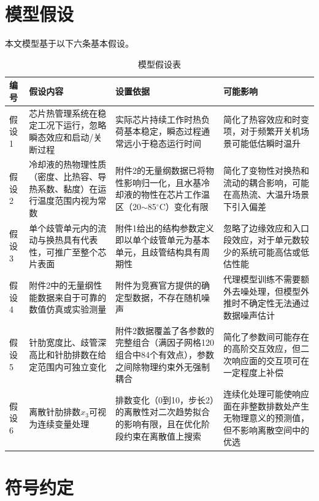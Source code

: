 \documentclass[12pt,a4paper]{ctexart}
\begin{document}
\section{模型假设}

本文模型基于以下六条基本假设。

\begin{table}[H]
\centering
\caption{模型假设表}
\footnotesize
\begin{tabular}{p{}p{}p{}p{}}
\toprule
编号 & 假设内容 & 设置依据 & 可能影响 \\
\midrule
假设1 & 芯片热管理系统在稳定工况下运行，忽略瞬态效应和启动/关断过程 & 实际芯片持续工作时热负荷基本稳定，瞬态过程通常远小于稳态运行时间 & 简化了热容效应和时变项，对于频繁开关机场景可能低估瞬时温升 \\
\addlinespace
假设2 & 冷却液的热物理性质（密度、比热容、导热系数、黏度）在运行温度范围内视为常数 & 附件2的无量纲数据已将物性影响归一化，且水基冷却液的物性在芯片工作温区（20$\sim$85$^\circ$C）变化有限 & 简化了变物性对换热和流动的耦合影响，可能在高热流、大温升场景下引入偏差 \\
\addlinespace
假设3 & 单个歧管单元内的流动与换热具有代表性，可推广至整个芯片表面 & 附件1给出的结构参数定义即以单个歧管单元为基本单元，且歧管结构具有周期性 & 忽略了边缘效应和入口段效应，对于单元数较少的系统可能高估或低估性能 \\
\addlinespace
假设4 & 附件2中的无量纲性能数据来自于可靠的数值仿真或实验测量 & 附件为竞赛官方提供的确定型数据，不存在随机噪声 & 代理模型训练不需要额外去噪处理，但模型外推时不确定性无法通过数据噪声估计 \\
\addlinespace
假设5 & 针肋宽度比、歧管深高比和针肋排数在给定范围内可独立变化 & 附件2数据覆盖了各参数的完整组合（满因子网格120组合中84个有效点），参数之间除物理约束外无强制耦合 & 简化了参数间可能存在的高阶交互效应，但二次响应面的交互项可在一定程度上补偿 \\
\addlinespace
假设6 & 离散针肋排数$x_3$可视为连续变量处理 & 排数变化（0到10，步长2）的离散性对二次趋势拟合的影响有限，且在优化阶段约束在离散值上搜索 & 连续化处理可能使响应面在非整数排数处产生无物理意义的预测值，但不影响离散空间中的优选 \\
\bottomrule
\end{tabular}
\end{table}

\section{符号约定}
\end{document}
